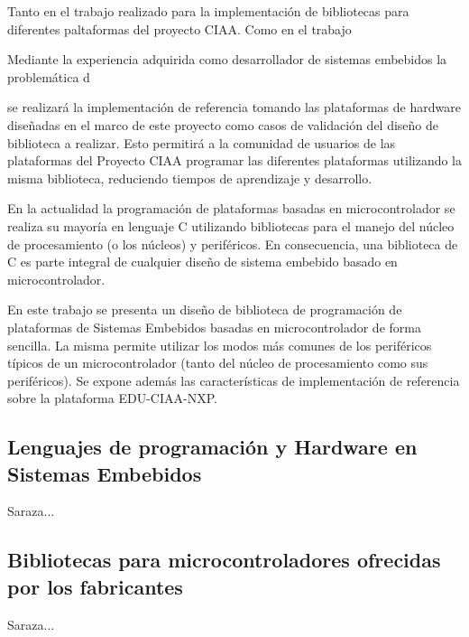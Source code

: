 Tanto en el trabajo realizado para la implementación de bibliotecas para diferentes paltaformas del proyecto CIAA. Como en el trabajo 

Mediante la experiencia adquirida como desarrollador de sistemas embebidos la problemática d


se realizará la implementación de referencia tomando las plataformas de hardware diseñadas en el marco de este proyecto como casos de validación del diseño de biblioteca a realizar. Esto permitirá a la comunidad de usuarios de las plataformas del Proyecto CIAA programar las diferentes plataformas utilizando la misma biblioteca, reduciendo tiempos de aprendizaje y desarrollo.










En la actualidad la programación de plataformas basadas en microcontrolador se realiza su mayoría en lenguaje C utilizando bibliotecas para el manejo del núcleo de procesamiento (o los núcleos) y periféricos. En consecuencia, una biblioteca de C es parte integral de cualquier diseño de sistema embebido basado en microcontrolador. 

En este trabajo se presenta un diseño de biblioteca de programación de plataformas de Sistemas Embebidos basadas en microcontrolador de forma sencilla. La misma permite utilizar los modos más comunes de los periféricos típicos de un microcontrolador (tanto del núcleo de procesamiento como sus periféricos). Se expone además las características de implementación de referencia sobre la plataforma EDU-CIAA-NXP.

\subsection{Lenguajes de programación y Hardware en Sistemas Embebidos}

Saraza...


\subsection{Bibliotecas para microcontroladores ofrecidas por los fabricantes}

Saraza...

